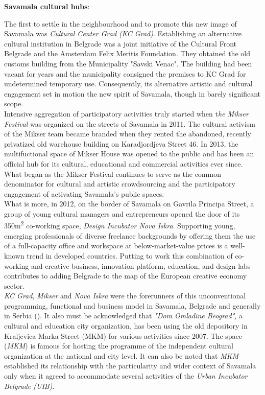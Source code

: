 \documentclass[11pt]{report}
\begin{document}
\textbf{Savamala cultural hubs}: 

The first to settle in the neighbourhood and to promote this new image of Savamala was \textit{Cultural Center Grad (KC Grad)}. Establishing an alternative cultural institution in Belgrade was a joint initiative of the Cultural Front Belgrade and the Amsterdam Felix Meritis Foundation.
They obtained the old customs building from the Municipality "Savski Venac".
The building had been vacant for years and the municipality consigned the premises to KC Grad for undetermined temporary use. Consequently, its alternative artistic and cultural engagement set in motion the new spirit of Savamala, though in barely significant scope.
\\

Intensive aggregation of participatory activities truly started when t\textit{he Mikser Festival} was organized on the streets of Savamala in 2011. The cultural activism of the Mikser team became branded when they rented the abandoned, recently privatized old warehouse building on Karadjordjeva Street 46. In 2013, the multifuctional space of Mikser House was opened to the public and has been an official hub for its cultural, educational and commercial activities ever since. What began as the Mikser Festival continues to serve as the common denominator for cultural and artistic crowdsourcing and the participatory engagement of activating Savamala’s public spaces.
\\
What is more, in 2012, on the border of Savamala on Gavrila Principa Street, a group of young cultural managers and entrepreneurs opened the door of its 350m\textsuperscript{2} co-working space, \textit{Design Incubator Nova Iskra}. Supporting young, emerging professionals of diverse freelance backgrounds by offering them the use of a full-capacity office and workspace at below-market-value prices is a well-known trend in  developed countries. 
Putting to work this combination of co-working and creative business, innovation platform, education, and design labs contributes to adding Belgrade to the map of the European creative economy sector. 
\\

\textit{KC Grad}, \textit{Mikser} and \textit{Nova Iskra} were the forerunners of this unconventional programming, functional and business model in Savamala, Belgrade and generally in Serbia (\href{Doytchinov}{\citealt{doytchinov_urban_2015}}). %
It also must be acknowledged that \textit{"Dom Omladine Beograd"}, a cultural and education city organization, has been using the old depository in Kraljevica Marka Street (MKM) for various activities since 2007.
The space (\textit{MKM}) is famous for hosting the programme of the independent cultural organization at the national and city level.
It can also be noted that \textit{MKM} established its relationship with the particularity and wider context of Savamala only when it agreed to accommodate several activities of the \textit{Urban Incubator Belgrade (UIB)}.
\\
\end{document}
